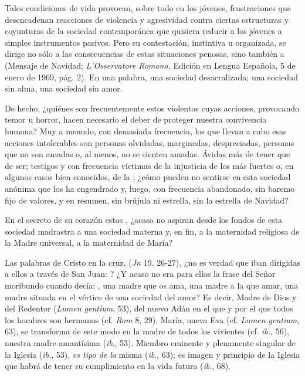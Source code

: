 \begin{body}
	Tales condiciones de vida provocan, sobre todo en los jóvenes, frustraciones que desencadenan reacciones de violencia y agresividad contra ciertas estructuras y coyunturas de la sociedad contemporánea que quisiera reducir a los jóvenes a simples instrumentos pasivos. Pero su contestación, instintiva u organizada, se dirige no sólo a las consecuencias de estas situaciones penosas, sino también a  (Mensaje de Navidad; \emph{L'Osservatore Romano,} Edición en Lengua Española, 5 de enero de 1969, pág. 2). En una palabra, una sociedad desacralizada; una sociedad sin alma, una sociedad sin amor.
	
	De hecho, ¿quiénes son frecuentemente estos violentos cuyas acciones, provocando temor u horror, hacen necesario el deber de proteger nuestra convivencia humana? Muy a menudo, con demasiada frecuencia, los que llevan a cabo esas acciones intolerables son personas olvidadas, marginadas, despreciadas, personas que no son amadas o, al menos, no se sienten amadas. Ávidas más de tener que de ser; testigos y con frecuencia víctimas de la injusticia de los más fuertes o, en algunos casos bien conocidos, de la ; ¿cómo pueden no sentirse  en esta sociedad anónima que los ha engendrado y, luego, con frecuencia abandonado, sin baremo fijo de valores, y en resumen, sin brújula ni estrella, sin la estrella de Navidad?
	
	En el secreto de su corazón estos , ¿acaso no aspiran desde los fondos de esta sociedad madrastra a una sociedad materna y, en fin, a la maternidad religiosa de la Madre universal, a la maternidad de María?
	
	Las palabras de Cristo en la cruz,  (\emph{Jn} 19, 26-27), ¿no es verdad que iban dirigidas a ellos a través de San Juan: ? ¿Y acaso no era para ellos la frase del Señor moribundo cuando decía: , una madre que os ama, una madre a la que amar, una madre situada en el vértice de una sociedad del amor? Es decir, Madre de Dios y del Redentor (\emph{Lumen gentium}, 53), del nuevo Adán en el que y por el que todos los hombres son hermanos (cf. \emph{Rom} 8, 29), María, nueva Eva (cf. \emph{Lumen gentium}, 63), se transforma de este modo en la madre de todos los vivientes (cf. \emph{ib.}, 56), nuestra madre amantísima (\emph{ib}., 53). Miembro eminente y plenamente singular de la Iglesia (\emph{ib.}, 53), \emph{es tipo de la} misma (\emph{ib}., 63); es imagen y principio de la Iglesia que habrá de tener su cumplimiento en la vida futura (\emph{ib}., 68).
	

\end{body}

